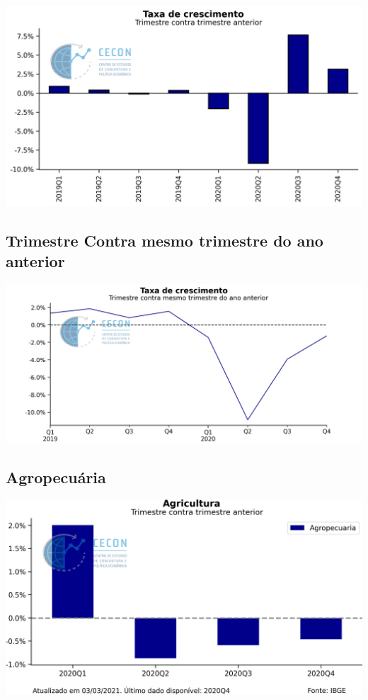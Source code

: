 \documentclass{SelfArx}
\begin{document}
\begin{center}
\includegraphics[width=.9\linewidth]{./figs/PIB/PIB.png}
\end{center}

\subsection*{Trimestre Contra mesmo trimestre do ano anterior}
\label{sec:orgdc68c8b}

\begin{center}
\includegraphics[width=.9\linewidth]{./figs/PIB/PIB_YoY.png}
\end{center}

\subsection*{Agropecuária}
\label{sec:org8393778}

\begin{center}
\includegraphics[width=.9\linewidth]{./figs/PIB/Agropecuaria.png}
\end{center}
\end{document}
